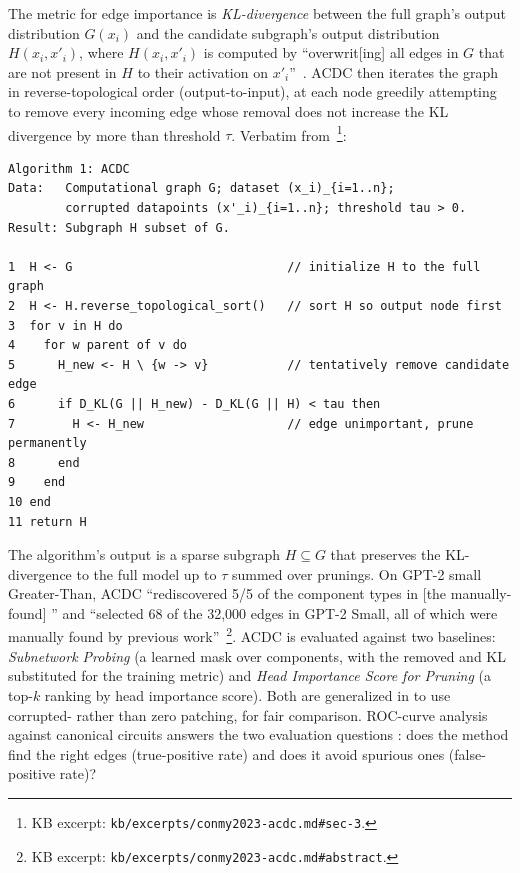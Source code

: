 The metric for edge importance is \emph{KL-divergence} between the full
graph's output distribution $G(x_i)$ and the candidate subgraph's
output distribution $H(x_i, x'_i)$, where $H(x_i, x'_i)$ is computed by
``overwrit[ing] all edges in $G$ that are not present in $H$ to their
activation on $x'_i$''~\citep[\S 3]{conmy2023-acdc}. ACDC then iterates
the graph in reverse-topological order (output-to-input), at each node
greedily attempting to remove every incoming edge whose removal does
not increase the KL divergence by more than threshold $\tau$. Verbatim
from~\citet[Algorithm 1]{conmy2023-acdc}\footnote{KB excerpt:
\texttt{kb/excerpts/conmy2023-acdc.md\#sec-3}.}:

\begin{lstlisting}[caption={ACDC, the Automatic Circuit DisCovery algorithm.},label={lst:acdc}]
Algorithm 1: ACDC
Data:   Computational graph G; dataset (x_i)_{i=1..n};
        corrupted datapoints (x'_i)_{i=1..n}; threshold tau > 0.
Result: Subgraph H subset of G.

1  H <- G                              // initialize H to the full graph
2  H <- H.reverse_topological_sort()   // sort H so output node first
3  for v in H do
4    for w parent of v do
5      H_new <- H \ {w -> v}           // tentatively remove candidate edge
6      if D_KL(G || H_new) - D_KL(G || H) < tau then
7        H <- H_new                    // edge unimportant, prune permanently
8      end
9    end
10 end
11 return H
\end{lstlisting}

The algorithm's output is a sparse subgraph $H \subseteq G$ that
preserves the KL-divergence to the full model up to $\tau$ summed over
prunings. On GPT-2 small Greater-Than, ACDC ``rediscovered 5/5 of the
component types in [the manually-found] '' and ``selected 68 of
the 32{,}000 edges in GPT-2 Small, all of which were manually found by
previous work''~\citep[Abstract]{conmy2023-acdc}\footnote{KB excerpt:
\texttt{kb/excerpts/conmy2023-acdc.md\#abstract}.}. ACDC is evaluated
against two baselines: \emph{Subnetwork Probing} (a learned mask over
components, with the  removed and KL substituted for the
training metric) and \emph{Head Importance Score for Pruning} (a
top-$k$ ranking by head importance score). Both are generalized in
\citet{conmy2023-acdc} to use corrupted- rather
than zero patching, for fair comparison. ROC-curve analysis against
canonical circuits answers the two evaluation questions
\citep[\S 4]{conmy2023-acdc}: does the method find the right edges
(true-positive rate) and does it avoid spurious ones (false-positive
rate)?

